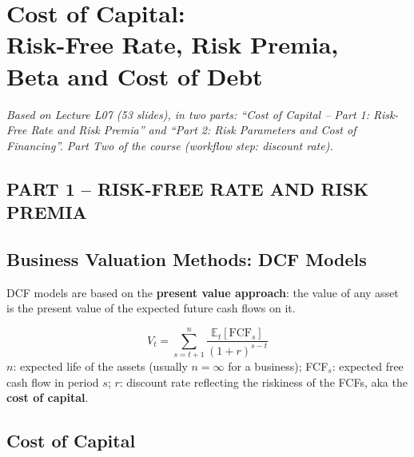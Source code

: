 \chapter[Cost of Capital: Risk-Free Rate, Risk Premia, Beta, Cost of Debt]{Cost of Capital:\\Risk-Free Rate, Risk Premia,\\Beta and Cost of Debt}\label{ch:coc}

\emph{Based on Lecture L07 (53 slides), in two parts: ``Cost of Capital -- Part 1: Risk-Free Rate and Risk Premia'' and ``Part 2: Risk Parameters and Cost of Financing''. Part Two of the course (workflow step: discount rate).}

\section*{PART 1 -- RISK-FREE RATE AND RISK PREMIA}

\section{Business Valuation Methods: DCF Models}

DCF models are based on the \textbf{present value approach}: the value of any asset is the present value of the expected future cash flows on it.
\begin{keybox}
\[
V_t=\sum_{s=t+1}^{n}\frac{\mathbb{E}_t[\text{FCF}_s]}{(1+r)^{s-t}}
\]
$n$: expected life of the assets (usually $n=\infty$ for a business); FCF$_s$: expected free cash flow in period $s$; $r$: discount rate reflecting the riskiness of the FCFs, aka the \textbf{cost of capital}.
\end{keybox}

\section{Cost of Capital}

